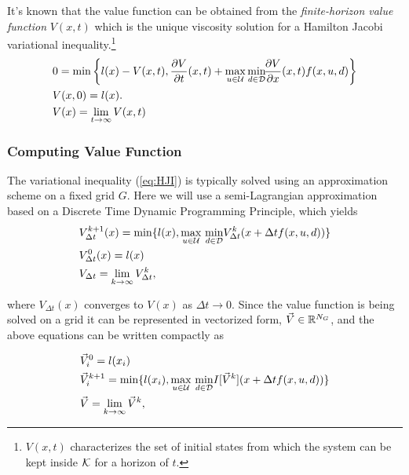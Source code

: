 \documentclass[letterpaper, 10 pt, conference]{ieeeconf}
\begin{document}
It's known that the value function can be obtained from the \emph{finite-horizon value function} $V(x,t)$ which is the unique viscosity solution for a Hamilton Jacobi variational inequality.\footnote{$V(x,t)$ characterizes the set of initial states from which the system can be kept inside $\mathcal{K}$ for a horizon of $t$.
} 
\begin{subequations}\label{eq:HJI}\begin{align}
    & 0 = \min\left\{l(x)-V(x,t), \frac{\partial V}{\partial t}(x,t)+ \max_{u\in\mathcal{U}} \min_{ d\in\mathcal{D}} \!\!\frac{\partial V}{\partial x}(x,t) f(x,u, d)\right\}\label{eq:HJIa}\\
    &V(x,0) = l(x).\label{eq:HJIb}\\
    &V(x) = \lim_{t \rightarrow \infty} V(x,t)
\end{align}\end{subequations}




\subsubsection{Computing Value Function}

The variational inequality (\ref{eq:HJI}) is typically solved using an approximation scheme on a fixed grid $G$. Here we will use a semi-Lagrangian approximation based on a Discrete Time Dynamic Programming Principle, which yields
\begin{subequations}
\begin{align}
&V_{\Delta t}^{k+1}(x) = \min\{l(x),  \underset{u\in\mathcal{U}}{\max}\text{ }\underset{ d\in\mathcal{D}}{\min} V^{k}_{\Delta t}(x+\Delta t f(x,u,d))\}\\
&V_{\Delta t}^{0}(x) = l(x)\\
&V_{\Delta t} = \lim_{k\rightarrow \infty} V^{k}_{\Delta t},
\end{align}
\end{subequations}

\noindent where $V_{\Delta t}(x)$ converges to $V(x)$ as $\Delta t \rightarrow 0$. Since the value function is being solved on a grid it can be represented in vectorized form, $\vec{V} \in \mathbb{R}^{N_G}$, and the above equations can be written compactly as

\begin{subequations} \label{eq:dp_min_dist}
\begin{align}
&\vec{V}_{i}^{0} = l(x_i)\\
&\vec{V}_{i}^{k+1} = \min\{l(x_i),  \underset{u\in\mathcal{U}}{\max}\text{ }\underset{ d\in\mathcal{D}}{\min} I[\vec{V}^{k}](x+\Delta t f(x,u,d)) \label{eq:dp_min_dist_b}\}\\
&\vec{V} = \lim_{k\rightarrow \infty} \vec{V}^{k},
\end{align}
\end{subequations}
\end{document}
